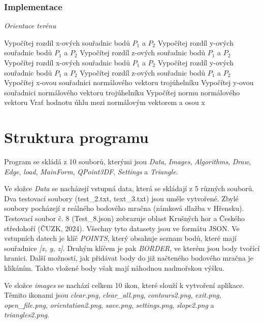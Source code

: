 \documentclass{article}
\begin{document}
\begin{spacing}{1.5}
\subsubsection*{Implementace}
\begin{algorithm}[h]
    \caption {\textit{Orientace terénu}}
    \begin{algorithmic}[1]
        \State Vypočítej rozdíl x-ových souřadnic bodů $P_1$ a $P_2$
        \State Vypočítej rozdíl y-ových souřadnic bodů $P_1$ a $P_2$
        \State Vypočítej rozdíl z-ových souřadnic bodů $P_1$ a $P_2$
        \State Vypočítej rozdíl x-ových souřadnic bodů $P_1$ a $P_2$
        \State Vypočítej rozdíl y-ových souřadnic bodů $P_1$ a $P_2$
        \State Vypočítej rozdíl z-ových souřadnic bodů $P_1$ a $P_2$
        \State Vypočítej x-ovou souřadnici normálového vektoru trojúhelníku
        \State Vypočítej y-ovou souřadnici normálového vektoru trojúhelníku
        \State Vypočítej normu normálového vektoru
        \State Vrať hodnotu úhlu mezi normálovým vektorem a osou x
    \end{algorithmic}
\end{algorithm}

\section{Struktura programu}
Program se skládá z 10 souborů, kterými jsou \textit{Data}, \textit{Images}, \textit{Algorithms}, \textit{Draw}, \textit{Edge}, \textit{load},\textit{ MainForm}, \textit{QPoint3DF}, \textit{Settings} a \textit{Triangle}.

Ve složce \textit{Data} se nacházejí vstupná data, která se skládají z 5 různých souborů. Dva testovací soubory (test\_2.txt, text\_3.txt) jsou uměle vytvořené. Zbylé soubory pocházejí z reálného bodového mračna (zámková dlažba v Hřensku). Testovací soubor č. 8 (Test\_8.json) zobrazuje oblast Krušných hor a Českého středohoří (ČUZK, 2024). Všechny tyto datasety jsou ve formátu JSON. Ve vstupních datech je klíč \textit{POINTS}, který obsahuje seznam bodů, které mají souřadnice \textit{[x, y, z]}. Druhým klíčem je pak \textit{BORDER}, ve kterém jsou body tvořící hranici. Další možností, jak přidávat body do již načteného bodového mračna je klikáním. Takto vložené body však mají náhodnou nadmořskou výšku.

Ve složce \textit{images} se nachází celkem 10 ikon, které slouží k vytvoření aplikace. Těmito ikonami jsou \textit{clear.png}, \textit{clear\_all.png}, \textit{contours2.png}, \textit{exit.png}, \textit{open\_file.png}, \textit{orientation2.png}, \textit{save.png}, \textit{settings.png}, \textit{slope2.png} a \textit{triangles2.png}.


\end{spacing}
\end{document}
